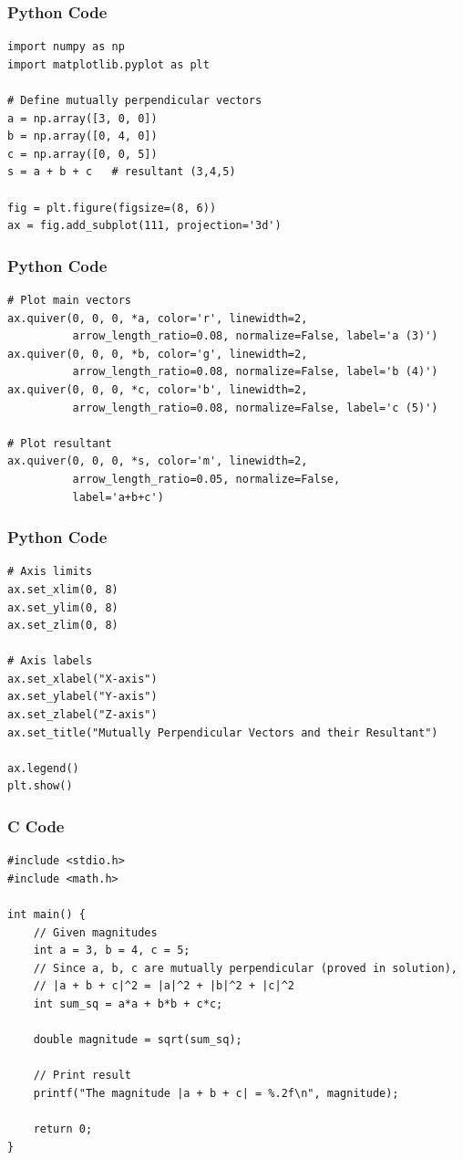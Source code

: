 \documentclass{beamer}
\begin{document}
\begin{frame}[fragile]
    \frametitle{Python Code}
    \begin{lstlisting}
import numpy as np
import matplotlib.pyplot as plt

# Define mutually perpendicular vectors
a = np.array([3, 0, 0])
b = np.array([0, 4, 0])
c = np.array([0, 0, 5])
s = a + b + c   # resultant (3,4,5)

fig = plt.figure(figsize=(8, 6))
ax = fig.add_subplot(111, projection='3d')
\end{lstlisting}
\end{frame}


\begin{frame}[fragile]
    \frametitle{Python Code}
    \begin{lstlisting}
# Plot main vectors
ax.quiver(0, 0, 0, *a, color='r', linewidth=2,
          arrow_length_ratio=0.08, normalize=False, label='a (3)')
ax.quiver(0, 0, 0, *b, color='g', linewidth=2,
          arrow_length_ratio=0.08, normalize=False, label='b (4)')
ax.quiver(0, 0, 0, *c, color='b', linewidth=2,
          arrow_length_ratio=0.08, normalize=False, label='c (5)')

# Plot resultant
ax.quiver(0, 0, 0, *s, color='m', linewidth=2,
          arrow_length_ratio=0.05, normalize=False,
          label='a+b+c')
\end{lstlisting}
\end{frame}


\begin{frame}[fragile]
    \frametitle{Python Code}
    \begin{lstlisting}
# Axis limits
ax.set_xlim(0, 8)
ax.set_ylim(0, 8)
ax.set_zlim(0, 8)

# Axis labels
ax.set_xlabel("X-axis")
ax.set_ylabel("Y-axis")
ax.set_zlabel("Z-axis")
ax.set_title("Mutually Perpendicular Vectors and their Resultant")

ax.legend()
plt.show()

\end{lstlisting}
\end{frame}

\begin{frame}[fragile]
\frametitle{C Code}
\begin{lstlisting}
#include <stdio.h>
#include <math.h>

int main() {
    // Given magnitudes
    int a = 3, b = 4, c = 5;
    // Since a, b, c are mutually perpendicular (proved in solution),
    // |a + b + c|^2 = |a|^2 + |b|^2 + |c|^2
    int sum_sq = a*a + b*b + c*c;

    double magnitude = sqrt(sum_sq);

    // Print result
    printf("The magnitude |a + b + c| = %.2f\n", magnitude);

    return 0;
}
\end{lstlisting}

\end{frame}
\end{document}
